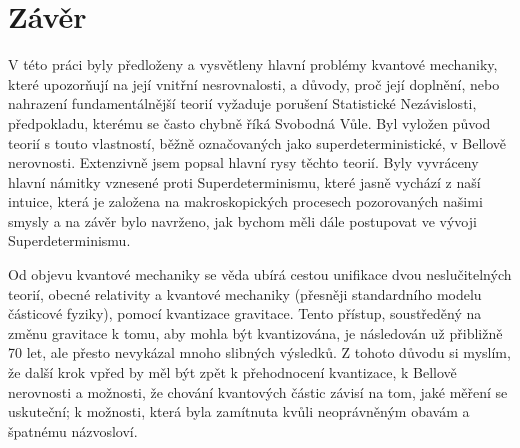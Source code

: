 \section*{Závěr}
\label{sec:conc}

V této práci byly předloženy a vysvětleny hlavní problémy kvantové mechaniky, které upozorňují na její vnitřní nesrovnalosti, a důvody, proč její doplnění, nebo nahrazení fundamentálnější teorií vyžaduje porušení Statistické Nezávislosti, předpokladu, kterému se často chybně říká Svobodná Vůle. Byl vyložen původ teorií s touto vlastností, běžně označovaných jako superdeterministické, v Bellově nerovnosti. Extenzivně jsem popsal hlavní rysy těchto teorií. Byly vyvráceny hlavní námitky vznesené proti Superdeterminismu, které jasně vychází z naší intuice, která je založena na makroskopických procesech pozorovaných našimi smysly a na závěr bylo navrženo, jak bychom měli dále postupovat ve vývoji Superdeterminismu.

Od objevu kvantové mechaniky se věda ubírá cestou unifikace dvou neslučitelných teorií, obecné relativity a kvantové mechaniky (přesněji standardního modelu částicové fyziky), pomocí kvantizace gravitace. Tento přístup, soustředěný na změnu gravitace k tomu, aby mohla být kvantizována, je následován už přibližně 70 let, ale přesto nevykázal mnoho slibných výsledků. Z tohoto důvodu si myslím, že další krok vpřed by měl být zpět k přehodnocení kvantizace, k Bellově nerovnosti a možnosti, že chování kvantových částic závisí na tom, jaké měření se uskuteční; k možnosti, která byla zamítnuta kvůli neoprávněným obavám a špatnému názvosloví.